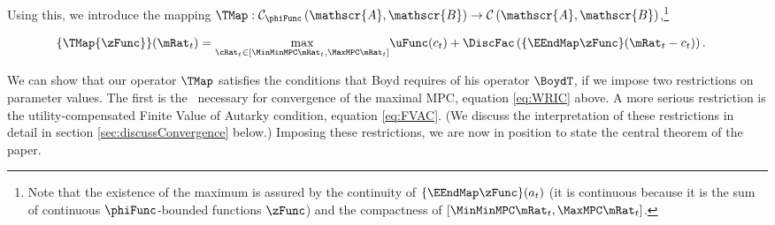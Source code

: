\documentclass[BufferStockTheory]{subfiles}
\begin{document}
Using this, we introduce the mapping \textit{$\TMap:\mathcal{C}_{\phiFunc }\left( \mathscr{A},\mathscr{B}\right) \rightarrow \mathcal{C}\left(
    \mathscr{A},\mathscr{B}\right) $},\footnote{Note that the existence of the maximum is assured by the continuity of $\{\EEndMap \zFunc\}(a_{t})$ (it is continuous because it is the sum of continuous $\phiFunc$-bounded functions $\zFunc$) and the compactness of $[\MinMinMPC \mRat_{t},  \MaxMPC \mRat_{t}]$.}
\begin{comment} %
  (In the subtle case when $\MinMinMPC=0$, the compact interval could be revised as $ [(\MinMinMPC+\epsilon) \mRat_{t},
  \MaxMPC \mRat_{t}]$ where $\epsilon$ is a very small positive number because obviously $\MinMinMPC \mRat_{t}=0$ will not be the $\argmax$)
\end{comment}
\begin{align}
  \{\TMap{\zFunc}\}(\mRat_{t})  & = \underset{{\cRat}_{t} \in
                                  [\MinMinMPC \mRat_{t}, \MaxMPC \mRat_{t}]
                                  } \max
                                  \uFunc(c_{t})+\DiscFac \left( \{\EEndMap \zFunc \}(\mRat_{t}-c_{t}) \right)  \label{definitionmappingT}.
\end{align}


\begin{comment}
  Unpacking the definitions, our mapping $\TMap$ can be written more explicitly as
  \begin{align}
    \{\TMap\zFunc\}(\mRat_{t})  & = \underset{\cRat_{t} \in [\MinMinMPC
                                  \mRat_{t}, \MaxMPC \mRat_{t}]} \max \left\{
                                  \uFunc(c_{t})+\DiscFac \Ex_{t}\left[ {\PGro}_{t+1} ^{1-\CRRA }\zFunc(
                                  {\aRat}_{t}\Rnorm_{t+1}+\tShkAll_{t+1}) \right] \right\}
                                  .
  \end{align}
\end{comment}

\hypertarget{Contraction-Conditions}{}

We can show that our operator $\TMap$ satisfies the conditions that
Boyd requires of his operator $\BoydT$, if we impose two restrictions
on parameter values.  The first is the \WRIC~necessary for
convergence of the maximal MPC, equation \eqref{eq:WRIC} above.  A
more serious restriction is the utility-compensated Finite Value of
Autarky condition, equation \eqref{eq:FVAC}.  (We discuss the
interpretation of these restrictions in detail in section
\ref{sec:discussConvergence} below.)  Imposing these restrictions, we
are now in position to state the central theorem of the paper.
\end{document}
